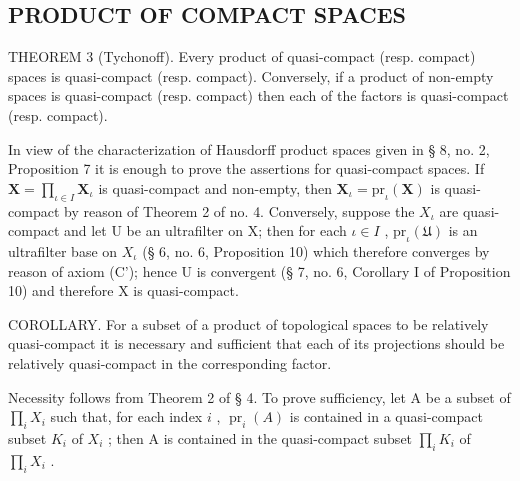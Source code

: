 \subsection{PRODUCT OF COMPACT SPACES}

THEOREM 3 (Tychonoff). Every product of quasi-compact (resp. compact) spaces is quasi-compact (resp. compact). Conversely, if a product of non-empty spaces is quasi-compact (resp. compact) then each of the factors is quasi-compact (resp. compact).

In view of the characterization of Hausdorff product spaces given in § 8, no. 2, Proposition 7 it is enough to prove the assertions for quasi-compact spaces. If \(\mathbf{X} = \prod_{\iota \in I} \mathbf{X}_{\iota}\) is quasi-compact and non-empty, then \(\mathbf{X}_{\iota}=\mathrm{pr}_{\iota}(\mathbf{X})\) is quasi-compact by reason of Theorem 2 of no. 4. Conversely, suppose the \(X_{\iota}\) are quasi-compact and let U be an ultrafilter on X; then for each \(\iota\in I\) , \(\mathrm{pr}_{\iota}(\mathfrak{U})\) is an ultrafilter base on \(X_{\iota}\) (§ 6, no. 6, Proposition 10) which therefore converges by reason of axiom (C'); hence U is convergent (§ 7, no. 6, Corollary I of Proposition 10) and therefore X is quasi-compact.

COROLLARY. For a subset of a product of topological spaces to be relatively quasi-compact it is necessary and sufficient that each of its projections should be relatively quasi-compact in the corresponding factor.

Necessity follows from Theorem 2 of § 4. To prove sufficiency, let A be a subset of \(\prod_{i} X_{i}\) such that, for each index \(i\) , \(\operatorname{pr}_{i}(A)\) is contained in a quasi-compact subset \(K_{i}\) of \(X_{i}\) ; then A is contained in the quasi-compact subset \(\prod_{i} K_{i}\) of \(\prod_{i} X_{i}\) .

